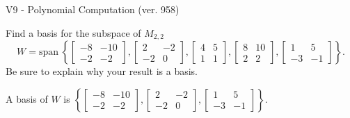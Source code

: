 \begin{exercise}
  \begin{exerciseTitle}V9 - Polynomial Computation (ver. 958)\end{exerciseTitle}
  \begin{exerciseStatement}
    Find a basis for the subspace of \(M_{2,2}\) 
\[W=\mathrm{span}\ \left\{\left[\begin{array}{cc}
-8 & -10 \\
-2 & -2
\end{array}\right] , \left[\begin{array}{cc}
2 & -2 \\
-2 & 0
\end{array}\right] , \left[\begin{array}{cc}
4 & 5 \\
1 & 1
\end{array}\right] , \left[\begin{array}{cc}
8 & 10 \\
2 & 2
\end{array}\right] , \left[\begin{array}{cc}
1 & 5 \\
-3 & -1
\end{array}\right]\right\}.\]
 Be sure to explain why your result is a basis.


  \end{exerciseStatement}
  \begin{exerciseAnswer}
   A basis of \(W\) is  \(\left\{\left[\begin{array}{cc}
-8 & -10 \\
-2 & -2
\end{array}\right] , \left[\begin{array}{cc}
2 & -2 \\
-2 & 0
\end{array}\right] , \left[\begin{array}{cc}
1 & 5 \\
-3 & -1
\end{array}\right]\right\}\).
  


  \end{exerciseAnswer}
\end{exercise}